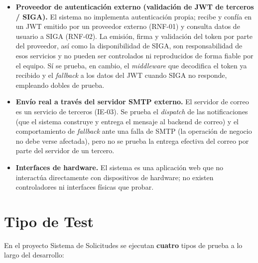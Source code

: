 \documentclass[12pt,letterpaper]{report}
\begin{document}
\begin{itemize}[leftmargin=*]
  \item \textbf{Proveedor de autenticación externo (validación de JWT de
  terceros / SIGA).} El sistema no implementa autenticación propia; recibe y
  confía en un JWT emitido por un proveedor externo (RNF-01) y consulta datos de
  usuario a SIGA (RNF-02). La emisión, firma y validación del token por parte
  del proveedor, así como la disponibilidad de SIGA, son responsabilidad de esos
  servicios y no pueden ser controlados ni reproducidos de forma fiable por el
  equipo. Sí se prueba, en cambio, el \emph{middleware} que decodifica el token
  ya recibido y el \emph{fallback} a los datos del JWT cuando SIGA no responde,
  empleando dobles de prueba.
  \item \textbf{Envío real a través del servidor SMTP externo.} El servidor de
  correo es un servicio de terceros (IE-03). Se prueba el \emph{dispatch} de las
  notificaciones (que el sistema construye y entrega el mensaje al backend de
  correo) y el comportamiento de \emph{fallback} ante una falla de SMTP (la
  operación de negocio no debe verse afectada), pero no se prueba la entrega
  efectiva del correo por parte del servidor de un tercero.
  \item \textbf{Interfaces de hardware.} El sistema es una aplicación web que no
  interactúa directamente con dispositivos de hardware; no existen controladores
  ni interfaces físicas que probar.
\end{itemize}

\section{Tipo de Test}

En el proyecto Sistema de Solicitudes se ejecutan \textbf{cuatro} tipos de
prueba a lo largo del desarrollo:
\end{document}
